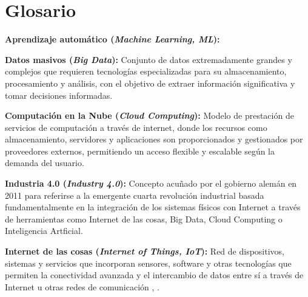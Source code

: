 \chapter{Glosario}\label{anexo:glosario}






\textbf{Aprendizaje automático (\textit{Machine Learning, ML}):} 


\textbf{Datos masivos (\textit{Big Data}):} Conjunto de datos extremadamente grandes y complejos que requieren tecnologías especializadas para su almacenamiento, procesamiento y análisis, con el objetivo de extraer información significativa y tomar decisiones informadas.


\textbf{Computación en la Nube (\textit{Cloud Computing}):} Modelo de prestación de servicios de computación a través de internet, donde los recursos como almacenamiento, servidores y aplicaciones son proporcionados y gestionados por proveedores externos, permitiendo un acceso flexible y escalable según la demanda del usuario.








\textbf{Industria 4.0 (\textit{Industry 4.0}):} Concepto acuñado por el gobierno alemán en 2011 para referirse a la emergente cuarta revolución industrial basada fundamentalmente en la integración de los sistemas físicos con Internet a través de herramientas como Internet de las cosas, Big Data, Cloud Computing o Inteligencia Artficial.

\textbf{Internet de las cosas (\textit{Internet of Things, IoT}):} Red de dispositivos, sistemas y servicios que incorporan sensores, software y otras tecnologías que permiten la conectividad avanzada y el intercambio de datos entre sí a través de Internet u otras redes de comunicación \cite{oracleiot}, \cite{wikipediaiot}.

